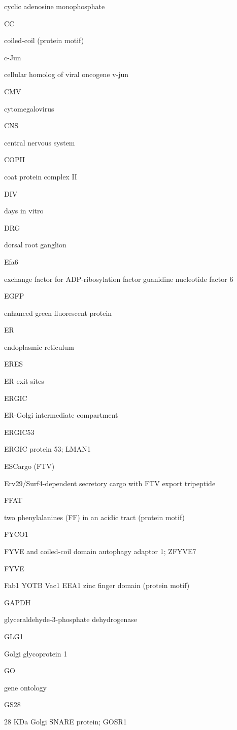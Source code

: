 \documentclass[
  12pt,
  a4paper,
]{book}
\begin{document}
cyclic adenosine monophosphate

CC

coiled-coil (protein motif)

c-Jun

cellular homolog of viral oncogene v-jun

CMV

cytomegalovirus

CNS

central nervous system

COPII

coat protein complex II

DIV

days in vitro

DRG

dorsal root ganglion

Efa6

exchange factor for ADP-ribosylation factor guanidine nucleotide factor 6

EGFP

enhanced green fluorescent protein

ER

endoplasmic reticulum

ERES

ER exit sites

ERGIC

ER-Golgi intermediate compartment

ERGIC53

ERGIC protein 53; LMAN1

ESCargo (FTV)

Erv29/Surf4-dependent secretory cargo with FTV export tripeptide

FFAT

two phenylalanines (FF) in an acidic tract (protein motif)

FYCO1

FYVE and coiled-coil domain autophagy adaptor 1; ZFYVE7

FYVE

Fab1 YOTB Vac1 EEA1 zinc finger domain (protein motif)

GAPDH

glyceraldehyde-3-phosphate dehydrogenase

GLG1

Golgi glycoprotein 1

GO

gene ontology

GS28

28 KDa Golgi SNARE protein; GOSR1
\end{document}
